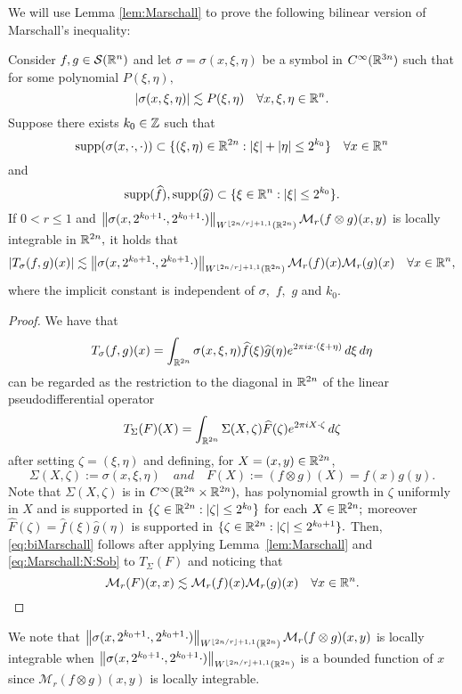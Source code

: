 We will use Lemma \ref{lem:Marschall} to prove the following bilinear version of Marschall's inequality:
\begin{lemma}\label{lem:biMarschall}  Consider $f,g\in{\mathcal{S}}({{\mathbb R}^n})$  and let $\sigma=\sigma(x,\xi,\eta)$ be a  symbol in $C^\infty(\mathbb{R}^{3n})$ 
such that for some polynomial $P(\xi,\eta),$
\[
\left\vert \sigma(x,\xi,\eta) \right\vert\lesssim P(\xi,\eta)\quad \forall x,\xi,\eta\in{{\mathbb R}^n}.
\]
Suppose there exists $k_0\in\mathbb{Z}$  such that
$$
{\rm{supp}}(\sigma(x, \cdot, \cdot)) \subset \{(\xi, \eta) \in \mathbb{R}^{2n}: |\xi| + |\eta| \le 2^{k_0}\}\quad \forall x\in{{\mathbb R}^n}
$$
and 
$$
{\rm{supp}}(\widehat{f}), {\rm{supp}}(\widehat{g}) \subset \{\xi \in \mathbb{R}^{n}: |\xi| \le 2^{k_0}\}.
$$
If $0< r\le1$ and $\left\|\sigma(x, 2^{k_0+1} \cdot, 2^{k_0+1} \cdot)\right\|_{W^{\lfloor{2n/r}\rfloor + 1,1}(\mathbb{R}^{2n})} \mathcal{M}_r(f\otimes g)(x,y) $ is locally integrable in $\mathbb{R}^{2n},$ it holds that
\begin{equation}\label{eq:biMarschall}
|T_{\sigma}(f,g)(x)| \lesssim  \left\|\sigma(x, 2^{k_0+1} \cdot, 2^{k_0+1} \cdot)\right\|_{W^{\lfloor{2n/r}\rfloor + 1,1}(\mathbb{R}^{2n})} \mathcal{M}_r(f)(x) \mathcal{M}_r(g)(x) \quad \forall x \in {{\mathbb R}^n},
\end{equation}
where the implicit constant is independent of $\sigma,$  $f,$ $g$ and $k_0.$
\end{lemma}
\begin{proof}
 We have that
$$
T_{\sigma}(f,g)(x) = \int_{\mathbb{R}^{2n}} \sigma(x, \xi, \eta) \widehat{f}(\xi) \widehat{g}(\eta) e^{2\pi i x \cdot (\xi + \eta)}\, d\xi\, d\eta
$$
can be regarded as the restriction to the diagonal in $\mathbb{R}^{2n}$ of the linear pseudodifferential operator
$$
T_\Sigma(F)(X) = \int_{\mathbb{R}^{2n}} \Sigma(X, \zeta) \widehat{F}(\zeta) e^{2\pi i X \cdot \zeta } \, d\zeta
$$
after setting $\zeta=(\xi, \eta)$ and defining, for $X = (x, y) \in \mathbb{R}^{2n}$, 
$$
\Sigma(X, \zeta) :=\sigma(x, \xi, \eta)\quad and \quad F(X):= (f\otimes g) (X)=f(x)g(y).
$$
Note that $\Sigma(X, \zeta)$ is in $C^\infty(\mathbb{R}^{2n}\times \mathbb{R}^{2n}),$  has polynomial growth in $\zeta$ uniformly in $X$ and  is supported in $\{\zeta\in\mathbb{R}^{2n}: \left\vert \zeta \right\vert\le 2^{k_0}\}$ for each $X\in \mathbb{R}^{2n};$ moreover $\widehat{F}(\zeta) =  \widehat{f}(\xi) \widehat{g}(\eta)$ is supported in $\{\zeta \in \mathbb{R}^{2n}: |\zeta| \leq 2^{k_0+1} \}.$ Then, \eqref{eq:biMarschall} follows after applying Lemma~\ref{lem:Marschall}  and \eqref{eq:Marschall:N:Sob} to $T_{\Sigma}(F)$ and noticing that 
\[
\mathcal{M}_r(F)(x, x)\lesssim \mathcal{M}_r(f)(x)\mathcal{M}_r(g)(x)\quad \forall x\in{{\mathbb R}^n}.
\]
\end{proof}

\begin{remark}
We note that $\left\|\sigma(x, 2^{k_0+1} \cdot, 2^{k_0+1} \cdot)\right\|_{W^{\lfloor{2n/r}\rfloor + 1,1}(\mathbb{R}^{2n})} \mathcal{M}_r(f\otimes g)(x,y) $ is locally integrable when  $\left\|\sigma(x, 2^{k_0+1} \cdot, 2^{k_0+1} \cdot)\right\|_{W^{\lfloor{2n/r}\rfloor + 1,1}(\mathbb{R}^{2n})}$ is a bounded function of $x$ since $\mathcal{M}_r(f\otimes g)(x,y)$ is locally integrable.
\end{remark}


